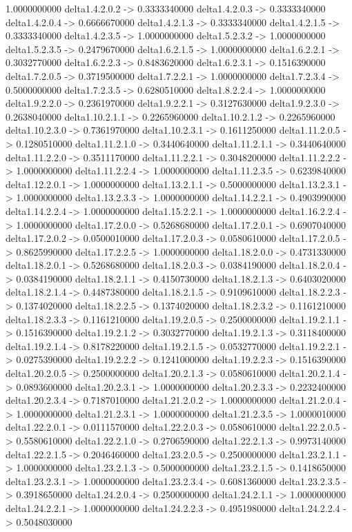 1.0000000000    delta1.4.2.0.2 -> 0.3333340000    delta1.4.2.0.3 -> 0.3333340000    delta1.4.2.0.4 -> 0.6666670000    delta1.4.2.1.3 -> 0.3333340000    delta1.4.2.1.5 -> 0.3333340000    delta1.4.2.3.5 -> 1.0000000000    delta1.5.2.3.2 -> 1.0000000000    delta1.5.2.3.5 -> 0.2479670000    delta1.6.2.1.5 -> 1.0000000000    delta1.6.2.2.1 -> 0.3032770000    delta1.6.2.2.3 -> 0.8483620000    delta1.6.2.3.1 -> 0.1516390000    delta1.7.2.0.5 -> 0.3719500000    delta1.7.2.2.1 -> 1.0000000000    delta1.7.2.3.4 -> 0.5000000000    delta1.7.2.3.5 -> 0.6280510000    delta1.8.2.2.4 -> 1.0000000000    delta1.9.2.2.0 -> 0.2361970000    delta1.9.2.2.1 -> 0.3127630000    delta1.9.2.3.0 -> 0.2638040000    delta1.10.2.1.1 -> 0.2265960000    delta1.10.2.1.2 -> 0.2265960000    delta1.10.2.3.0 -> 0.7361970000    delta1.10.2.3.1 -> 0.1611250000    delta1.11.2.0.5 -> 0.1280510000    delta1.11.2.1.0 -> 0.3440640000    delta1.11.2.1.1 -> 0.3440640000    delta1.11.2.2.0 -> 0.3511170000    delta1.11.2.2.1 -> 0.3048200000    delta1.11.2.2.2 -> 1.0000000000    delta1.11.2.2.4 -> 1.0000000000    delta1.11.2.3.5 -> 0.6239840000    delta1.12.2.0.1 -> 1.0000000000    delta1.13.2.1.1 -> 0.5000000000    delta1.13.2.3.1 -> 1.0000000000    delta1.13.2.3.3 -> 1.0000000000    delta1.14.2.2.1 -> 0.4903990000    delta1.14.2.2.4 -> 1.0000000000    delta1.15.2.2.1 -> 1.0000000000    delta1.16.2.2.4 -> 1.0000000000    delta1.17.2.0.0 -> 0.5268680000    delta1.17.2.0.1 -> 0.6907040000    delta1.17.2.0.2 -> 0.0500010000    delta1.17.2.0.3 -> 0.0580610000    delta1.17.2.0.5 -> 0.8625990000    delta1.17.2.2.5 -> 1.0000000000    delta1.18.2.0.0 -> 0.4731330000    delta1.18.2.0.1 -> 0.5268680000    delta1.18.2.0.3 -> 0.0384190000    delta1.18.2.0.4 -> 0.0384190000    delta1.18.2.1.1 -> 0.4150730000    delta1.18.2.1.3 -> 0.6403020000    delta1.18.2.1.4 -> 0.4487380000    delta1.18.2.1.5 -> 0.9109610000    delta1.18.2.2.3 -> 0.1374020000    delta1.18.2.2.5 -> 0.1374020000    delta1.18.2.3.2 -> 0.1161210000    delta1.18.2.3.3 -> 0.1161210000    delta1.19.2.0.5 -> 0.2500000000    delta1.19.2.1.1 -> 0.1516390000    delta1.19.2.1.2 -> 0.3032770000    delta1.19.2.1.3 -> 0.3118400000    delta1.19.2.1.4 -> 0.8178220000    delta1.19.2.1.5 -> 0.0532770000    delta1.19.2.2.1 -> 0.0275390000    delta1.19.2.2.2 -> 0.1241000000    delta1.19.2.2.3 -> 0.1516390000    delta1.20.2.0.5 -> 0.2500000000    delta1.20.2.1.3 -> 0.0580610000    delta1.20.2.1.4 -> 0.0893600000    delta1.20.2.3.1 -> 1.0000000000    delta1.20.2.3.3 -> 0.2232400000    delta1.20.2.3.4 -> 0.7187010000    delta1.21.2.0.2 -> 1.0000000000    delta1.21.2.0.4 -> 1.0000000000    delta1.21.2.3.1 -> 1.0000000000    delta1.21.2.3.5 -> 1.0000010000    delta1.22.2.0.1 -> 0.0111570000    delta1.22.2.0.3 -> 0.0580610000    delta1.22.2.0.5 -> 0.5580610000    delta1.22.2.1.0 -> 0.2706590000    delta1.22.2.1.3 -> 0.9973140000    delta1.22.2.1.5 -> 0.2046460000    delta1.23.2.0.5 -> 0.2500000000    delta1.23.2.1.1 -> 1.0000000000    delta1.23.2.1.3 -> 0.5000000000    delta1.23.2.1.5 -> 0.1418650000    delta1.23.2.3.1 -> 1.0000000000    delta1.23.2.3.4 -> 0.6081360000    delta1.23.2.3.5 -> 0.3918650000    delta1.24.2.0.4 -> 0.2500000000    delta1.24.2.1.1 -> 1.0000000000    delta1.24.2.2.1 -> 1.0000000000    delta1.24.2.2.3 -> 0.4951980000    delta1.24.2.2.4 -> 0.5048030000    